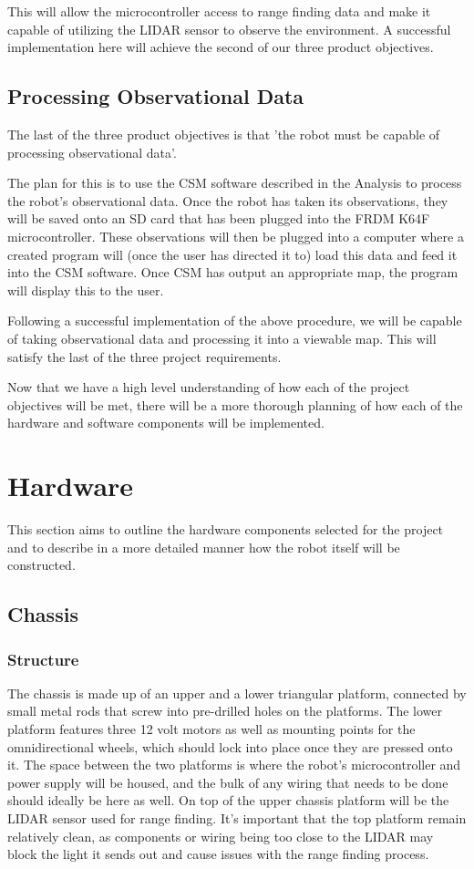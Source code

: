 		This will allow the microcontroller access to range finding data and make it capable of utilizing the LIDAR sensor to observe the environment. A successful implementation here will achieve the second of our three product objectives.
			
		\subsection{Processing Observational Data}
		The last of the three product objectives is that 'the robot must be capable of processing observational data'.
		
		The plan for this is to use the CSM software described in the Analysis to process the robot's observational data. Once the robot has taken its observations, they will be saved onto an SD card that has been plugged into the FRDM K64F microcontroller. These observations will then be plugged into a computer where a created program will (once the user has directed it to) load this data and feed it into the CSM software. Once CSM has output an appropriate map, the program will display this to the user.
		
		Following a successful implementation of the above procedure, we will be capable of taking observational data and processing it into a viewable map. This will satisfy the last of the three project requirements.
	
	\medskip
	Now that we have a high level understanding of how each of the project objectives will be met, there will be a more thorough planning of how each of the hardware and software components will be implemented.
	
	\section{Hardware}
	This section aims to outline the hardware components selected for the project and to describe in a more detailed manner how the robot itself will be constructed.
	
		\subsection{Chassis}
			\subsubsection{Structure}
			The chassis is made up of an upper and a lower triangular platform, connected by small metal rods that screw into pre-drilled holes on the platforms. The lower platform features three 12 volt motors as well as mounting points for the omnidirectional wheels, which should lock into place once they are pressed onto it. %
			The space between the two platforms is where the robot's microcontroller and power supply will be housed, and the bulk of any wiring that needs to be done should ideally be here as well. On top of the upper chassis platform will be the LIDAR sensor used for range finding. It's important that the top platform remain relatively clean, as components or wiring being too close to the LIDAR may block the light it sends out and cause issues with the range finding process.
			
